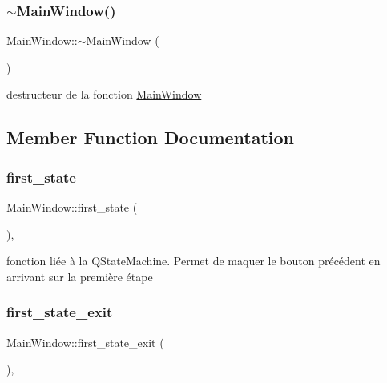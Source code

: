 \subsubsection{\texorpdfstring{$\sim$\+Main\+Window()}{~MainWindow()}}
{\footnotesize\ttfamily Main\+Window\+::$\sim$\+Main\+Window (\begin{DoxyParamCaption}{ }\end{DoxyParamCaption})}



destructeur de la fonction \hyperlink{classMainWindow}{Main\+Window} 



\subsection{Member Function Documentation}
\mbox{\label{classMainWindow_a408dd139f2400ee1fb7bd0e4545b2107}} 
\subsubsection{\texorpdfstring{first\+\_\+state}{first\_state}}
{\footnotesize\ttfamily Main\+Window\+::first\+\_\+state (\begin{DoxyParamCaption}{ }\end{DoxyParamCaption})\hspace{0.3cm}{\ttfamily [private]}, {\ttfamily [slot]}}



fonction liée à la Q\+State\+Machine. Permet de maquer le bouton précédent en arrivant sur la première étape 

\mbox{\label{classMainWindow_af15be8ac4337837cb0ceed0b9c490e0a}} 
\subsubsection{\texorpdfstring{first\+\_\+state\+\_\+exit}{first\_state\_exit}}
{\footnotesize\ttfamily Main\+Window\+::first\+\_\+state\+\_\+exit (\begin{DoxyParamCaption}{ }\end{DoxyParamCaption})\hspace{0.3cm}{\ttfamily [private]}, {\ttfamily [slot]}}



